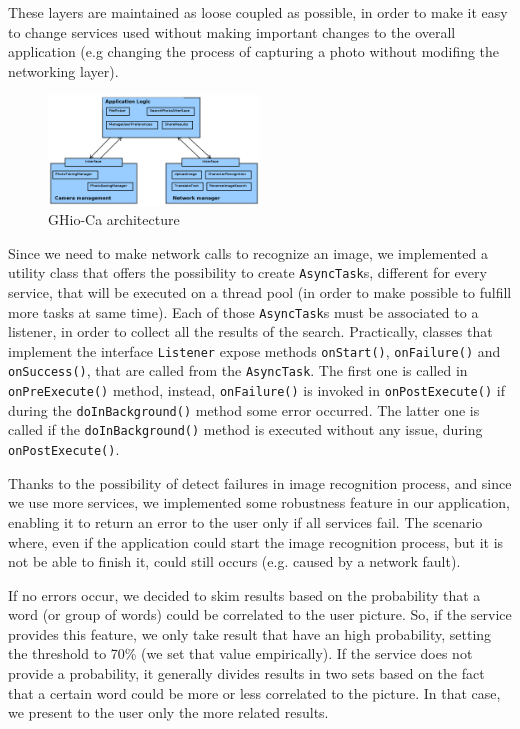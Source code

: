 These layers are maintained as loose coupled as possible, in order to make it
easy to change services used without making important changes to the overall
application (e.g changing the process of capturing a photo without modifing the
networking layer).

\begin{figure}[h]
    \centering
    \includegraphics[width=0.50\textwidth]{../img/ghioca_macro_component}
    \caption{GHio-Ca architecture}
    \label{fig:architecture}
\end{figure}

Since we need to make network calls to recognize an image, we implemented a
utility class that offers the possibility to create \texttt{AsyncTask}s,
different for every service, that will be executed on a thread pool (in order to
make possible to fulfill more tasks at same time). Each of those
\texttt{AsyncTask}s must be associated to a listener, in order to collect all
the results of the search. Practically, classes that implement the interface
\texttt{Listener} expose methods \texttt{onStart()}, \texttt{onFailure()} and
\texttt{onSuccess()}, that are called from the \texttt{AsyncTask}. The first one
is called in \texttt{onPreExecute()} method, instead, \texttt{onFailure()} is 
invoked in \texttt{onPostExecute()} if during the \texttt{doInBackground()} 
method some error occurred. The latter one is called if the 
\texttt{doInBackground()} method is executed without any issue, during 
\texttt{onPostExecute()}.

Thanks to the possibility of detect failures in image recognition process, and since
we use more services, we implemented some robustness feature in our application,
enabling it to return an error to the user only if all services fail. The
scenario where, even if the application could start the image recognition
process, but it is not be able to finish it, could still occurs (e.g. caused
by a network fault).

If no errors occur, we decided to skim results based on the probability that a
word (or group of words) could be correlated to the user picture. So, if the
service provides this feature, we only take result that have an high
probability, setting the threshold to 70\% (we set that value empirically). If the
service does not provide a probability, it generally divides results in two sets
based on the fact that a
certain word could be more or less correlated to the picture. In that case, we
present to the user only the more related results.

